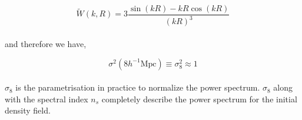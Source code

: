 \begin{equation}
	\tilde{W}(k,R) = 3\dfrac{\sin(kR) - kR \cos(kR)}{(kR)^3}
\end{equation}
\\
and therefore we have,

\begin{equation}
	\sigma^2(8 h^{-1} \mathrm{Mpc}) \equiv \sigma_8^2 \approx 1
\end{equation}
\\
$\sigma_8$ is the parametrisation in practice to normalize the power
spectrum. $\sigma_8$ along with the spectral index $n_s$ completely
describe the power spectrum for the initial density field.

